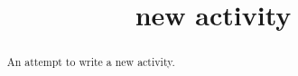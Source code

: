 \documentclass{ximera}
\title{new activity}
\begin{document}
\begin{abstract}
An attempt to write a new activity.
\end{abstract}
\maketitle
\end{document}
